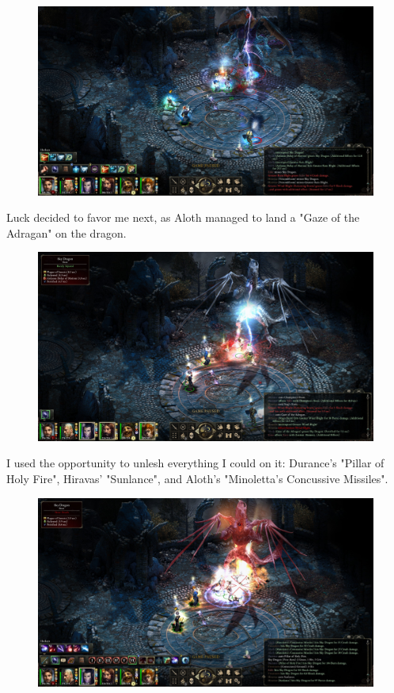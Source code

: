 \documentclass{article}
\begin{document}
\begin{figure}
\includegraphics[scale=0.33]{files/blog/2019_03_04_pillars_of_eternity_path_of_the_damned_act_iii/2019_03_04_northweald06.jpg}
\end{figure}

Luck decided to favor me next, as Aloth managed to land a "Gaze of the Adragan" on the dragon.

\begin{figure}
\includegraphics[scale=0.33]{files/blog/2019_03_04_pillars_of_eternity_path_of_the_damned_act_iii/2019_03_04_northweald07.jpg}
\end{figure}

I used the opportunity to unlesh everything I could on it: Durance's "Pillar of Holy Fire", Hiravas' "Sunlance", and Aloth's "Minoletta's Concussive Missiles".

\begin{figure}
\includegraphics[scale=0.33]{files/blog/2019_03_04_pillars_of_eternity_path_of_the_damned_act_iii/2019_03_04_northweald08.jpg}
\end{figure}
\end{document}
